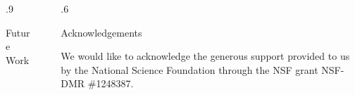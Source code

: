 \documentclass[final]{beamer}
\newlength{\sepwid}
\newlength{\onecolwid}
\begin{document}
\begin{frame}[t]
\begin{block}
\begin{columns}[t]
\begin{column}{.9\onecolwid}
\begin{alertblock}{Future Work}
  \end{alertblock}
\end{column}

\begin{column}{\sepwid}\end{column} %

\begin{column}{.6\onecolwid}
  \begin{alertblock}{Acknowledgements}

      We would like to acknowledge the generous support provided to us by the National Science
      Foundation through the NSF grant NSF-DMR \#1248387.
  \end{alertblock}
\end{column}
\end{columns} %
\end{block}
\vspace{1ex}


\end{frame} %
\end{document}
